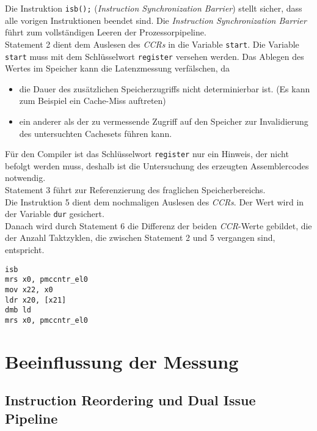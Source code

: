 \documentclass[]{scrbook}
\begin{document}
Die Instruktion \texttt{isb();} (\textsl{Instruction Synchronization Barrier}) stellt sicher, dass alle vorigen Instruktionen beendet sind.
Die \textsl{Instruction Synchronization Barrier} führt zum vollständigen Leeren der Prozessorpipeline. \cite[S.\,15]{armArch}
\\
Statement 2 dient dem Auslesen des \textsl{CCRs} in die Variable \texttt{start}.
Die Variable \texttt{start} muss mit dem Schlüsselwort \texttt{register} versehen werden.
Das Ablegen des Wertes im Speicher kann die Latenzmessung verfälschen, da

\begin{itemize}
	\item die Dauer des zusätzlichen Speicherzugriffs nicht determinierbar ist. (Es kann zum Beispiel ein Cache-Miss auftreten)
	\item ein anderer als der zu vermessende Zugriff auf den Speicher zur Invalidierung des untersuchten Cachesets führen kann.
\end{itemize}

Für den Compiler ist das Schlüsselwort \texttt{register} nur ein Hinweis, der nicht befolgt werden muss, deshalb ist die Untersuchung des erzeugten Assemblercodes notwendig.
\\
Statement 3 führt zur Referenzierung des fraglichen Speicherbereichs.
\\
Die Instruktion 5 dient dem nochmaligen Auslesen des \textsl{CCRs}.
Der Wert wird in der Variable \texttt{dur} gesichert.
\\
Danach wird durch Statement 6 die Differenz der beiden \textsl{CCR}-Werte gebildet, die der Anzahl Taktzyklen, die zwischen Statement 2 und 5 vergangen sind, entspricht.

\begin{lstlisting}[numbers=none, caption=vom Compiler generierter Assemblercode zum zweimaligen Auslesen des \textsl{\gls{ccr}s}, label=asm_mess]
isb
mrs x0, pmccntr_el0
mov	x22, x0
ldr	x20, [x21]
dmb ld
mrs x0, pmccntr_el0
\end{lstlisting}

\section{Beeinflussung der Messung} \label{ccrErrors}

\subsection{Instruction Reordering und Dual Issue Pipeline}
\end{document}
